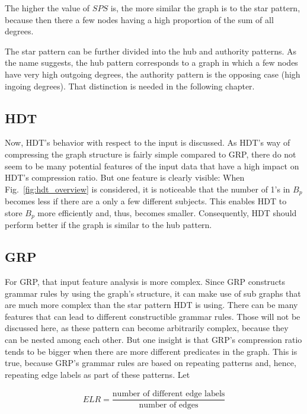 The higher the value of $SPS$ is, the more similar the graph is to the star pattern, because then there a few nodes having a high proportion of the sum of all degrees.

The star pattern can be further divided into the hub and authority patterns. As the name suggests, the hub pattern corresponds to a graph in which a few nodes have very high outgoing degrees, the authority pattern is the opposing case (high ingoing degrees). That distinction is needed in the following chapter.

\subsection{HDT}

Now, HDT's behavior with respect to the input is discussed. As HDT's way of compressing the graph structure is fairly simple compared to GRP, there do not seem to be many potential features of the input data that have a high impact on HDT's compression ratio. But one feature is clearly visible: When Fig.~\ref{fig:hdt_overview} is considered, it is noticeable that the number of 1's in $B_p$ becomes less if there are a only a few different subjects. This enables HDT to store $B_p$ more efficiently and, thus,  becomes smaller. Consequently, HDT should perform better if the graph is similar to the hub pattern.

\subsection{GRP}\label{sec:approachFeaturesGRP}
For GRP, that input feature analysis is more complex. Since GRP constructs grammar rules by using the graph's structure, it can make use of sub graphs that are much more complex than the star pattern HDT is using. There can be many features that can lead to different constructible grammar rules. Those will not be discussed here, as these pattern can become arbitrarily complex, because they can be nested among each other. But one insight is that GRP's compression ratio tends to be bigger when there are more different predicates in the graph. This is true, because GRP's grammar rules are based on repeating patterns and, hence, repeating edge labels as part of these patterns. Let
 
\begin{align*}
ELR = \dfrac{\text{number of different edge labels}}{\text{number of edges}} 
\end{align*}


